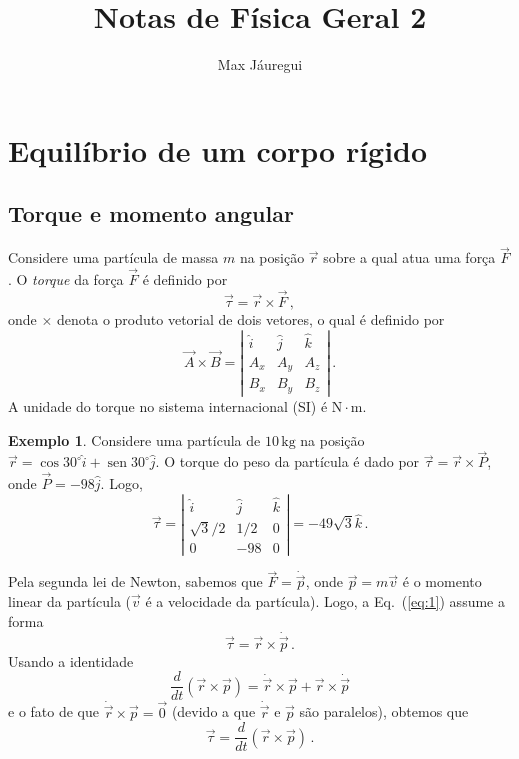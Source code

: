 \documentclass[twocolumn=on,DIV=calc]{scrartcl}
\title{Notas de Física Geral 2}
\author{Max Jáuregui}
\theoremstyle{definition}
\newtheorem{ex}{Exemplo}[section]
\DeclareMathOperator{\sen}{sen}
\begin{document}
\maketitle
\tableofcontents

\section{Equilíbrio de um corpo rígido}

\subsection{Torque e momento angular}

Considere uma partícula de massa $m$ na posição $\vec r$ sobre a qual
atua uma força $\vec F$. O \textit{torque} da força $\vec F$ é
definido por
\begin{equation}
  \label{eq:1}
  \vec\tau=\vec r\times\vec F\,,
\end{equation}
onde $\times$ denota o produto vetorial de dois vetores, o qual é
definido por
$$\vec A\times\vec B=
\left|
  \begin{array}{ccc}
    \hat i&\hat j&\hat k\\
    A_x&A_y&A_z\\
    B_x&B_y&B_z
  \end{array}
\right|\,.$$ A unidade do torque no sistema internacional (SI) é
$\mathrm{N}\cdot\mathrm{m}$.

\begin{ex}
  Considere uma partícula de $10\,\mathrm{kg}$ na posição
  $\vec r=\cos 30^\circ\hat i+\sen 30^\circ\hat j$. O torque do peso
  da partícula é dado por $\vec\tau=\vec r\times\vec P$, onde
  $\vec P=-98\hat j$. Logo,
  $$\vec\tau=\left|
  \begin{array}{ccc}
    \hat i&\hat j&\hat k\\
    \sqrt{3}/2&1/2&0\\
    0&-98&0
  \end{array}
\right|=-49\sqrt{3}\hat k\,.$$  
\end{ex}

Pela segunda lei de Newton, sabemos que $\vec F=\dot{\vec p}$, onde
$\vec p=m\vec v$ é o momento linear da partícula ($\vec v$ é a
velocidade da partícula). Logo, a Eq.~(\ref{eq:1}) assume a forma
$$\vec\tau=\vec r\times\dot{\vec p}\,.$$
Usando a identidade
\begin{equation}
  \label{eq:2}
  \frac{d}{dt}(\vec r\times\vec p)=\dot{\vec r}\times\vec p+\vec r\times\dot{\vec p}
\end{equation}
e o fato de que $\dot{\vec r}\times\vec p=\vec 0$ (devido a que
$\dot{\vec r}$ e $\vec p$ são paralelos), obtemos que
\begin{equation}
  \label{eq:3}
  \vec\tau=\frac{d}{dt}(\vec r\times\vec p)\,.
\end{equation}
\end{document}
